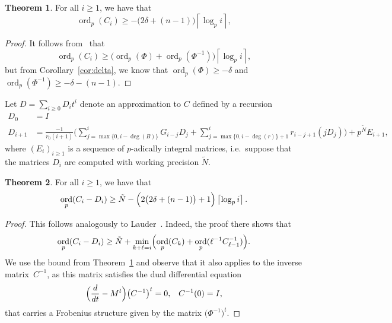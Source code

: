 \documentclass[a4paper,11pt]{article}
\numberwithin{equation}{section}
\providecommand{\ceil}[1]{\left\lceil#1\right\rceil}   %
\DeclareMathOperator{\ord}{ord}          %
\theoremstyle{definition}
\newtheorem{thm}{Theorem}[section]
\begin{document}
\begin{thm} \label{thm:valC}
For all $i \geq 1$, we have that
\begin{equation*}
\ord_p(C_i) \geq - \bigl(2 \delta + (n - 1)\bigr) \ceil{\log_p i},
\end{equation*}
\end{thm}

\begin{proof}
It follows from~\citep[Theorem~{18.3.3}]{Kedlaya2010} that
\begin{equation*}
\ord_p(C_i) \geq \bigl( \ord_p(\Phi) + \ord_p(\Phi^{-1}) \bigr) \ceil{\log_p i},
\end{equation*}
but from Corollary~\ref{cor:delta}, we know that $\ord_p(\Phi) \geq -\delta$ and 
$\ord_p(\Phi^{-1}) \geq -\delta-(n-1)$.
\end{proof}

Let $D=\sum_{i \geq 0} D_i t^i$ denote an approximation to $C$ 
defined by a recursion
\begin{align*}
D_0 &= I \\
D_{i+1} &= \frac{-1}{r_0 (i+1)} \biggl(
    \sum_{j=\max{\{0,i-\deg(B)\}}}^i G_{i-j} D_j + 
    \sum_{j=\max{\{0,i-\deg(r)\}}+1}^i r_{i-j+1} (j D_j) \biggr) + 
    p^{\tilde{N}} E_{i+1},
\end{align*}
where $(E_i)_{i \geq 1}$ is a sequence of $p$-adically integral matrices, i.e.\ suppose that the matrices $D_i$
are computed with working precision $\tilde{N}$.

\begin{thm} \label{thm:errorprop}
For all $i \geq 1$, we have that
\begin{equation*}
\ord_p(C_i - D_i) \geq 
    \tilde{N} - \Bigl(2 \bigl(2 \delta + (n-1)\bigr) + 1\Bigr) \ceil{\log_p i}.
\end{equation*}
\end{thm}

\begin{proof}
This follows analogously to
Lauder~\citep[Theorem~5.1]{Lauder2006}.  
Indeed, the proof there shows that 
\begin{equation*}
\ord_p(C_i - D_i) \geq 
    \tilde{N} + \min_{k+\ell=i} \Bigl(\ord_p(C_k) + 
                                      \ord_p(\ell^{-1} C_{\ell-1}^{-1})\Bigr).
\end{equation*}
We use the bound from Theorem~\ref{thm:valC} and observe that it 
also applies to the inverse matrix~$C^{-1}$, as this matrix satisfies 
the dual differential equation 
\begin{equation} \label{eq:01-GMDE-Dual}
\Bigl(\frac{d}{dt} - M^t\Bigr) \bigl(C^{-1}\bigr)^t = 0, \;\;\; C^{-1}(0)=I,
\end{equation}
that carries a Frobenius structure given by the matrix $\bigl(\Phi^{-1}\bigr)^t$. 
\end{proof}
\end{document}

